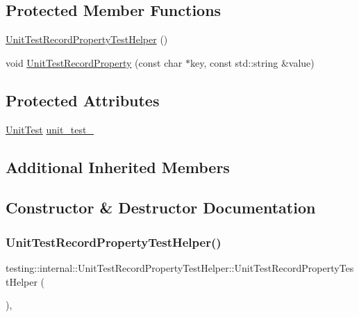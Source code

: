 \subsection*{Protected Member Functions}
\begin{DoxyCompactItemize}
\item 
\hyperlink{classtesting_1_1internal_1_1_unit_test_record_property_test_helper_aa2bdfe52eb2aab5233ce9118917a4750}{Unit\+Test\+Record\+Property\+Test\+Helper} ()
\item 
void \hyperlink{classtesting_1_1internal_1_1_unit_test_record_property_test_helper_a9c5432d080faf13a1db6baff0a2944f4}{Unit\+Test\+Record\+Property} (const char $\ast$key, const std\+::string \&value)
\end{DoxyCompactItemize}
\subsection*{Protected Attributes}
\begin{DoxyCompactItemize}
\item 
\hyperlink{classtesting_1_1_unit_test}{Unit\+Test} \hyperlink{classtesting_1_1internal_1_1_unit_test_record_property_test_helper_a415e13a354d3b8bd97db96aae5ef5df1}{unit\+\_\+test\+\_\+}
\end{DoxyCompactItemize}
\subsection*{Additional Inherited Members}


\subsection{Constructor \& Destructor Documentation}
\mbox{\label{classtesting_1_1internal_1_1_unit_test_record_property_test_helper_aa2bdfe52eb2aab5233ce9118917a4750}} 
\subsubsection{\texorpdfstring{Unit\+Test\+Record\+Property\+Test\+Helper()}{UnitTestRecordPropertyTestHelper()}}
{\footnotesize\ttfamily testing\+::internal\+::\+Unit\+Test\+Record\+Property\+Test\+Helper\+::\+Unit\+Test\+Record\+Property\+Test\+Helper (\begin{DoxyParamCaption}{ }\end{DoxyParamCaption})\hspace{0.3cm}{\ttfamily [inline]}, {\ttfamily [protected]}}



